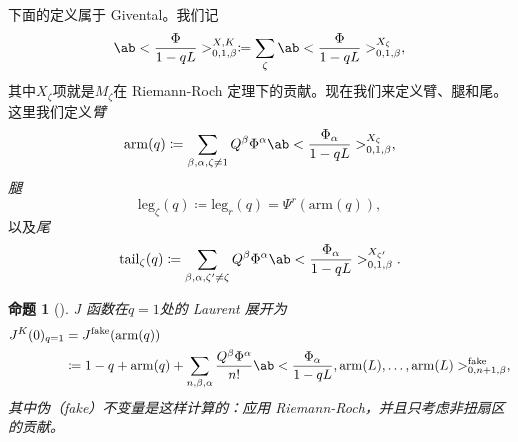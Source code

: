 \documentclass{amsart}
\newtheorem{prop}[thm]{命题}
\theoremstyle{definition}
\theoremstyle{remark}
\theoremstyle{plain}
\theoremstyle{definition}
\theoremstyle{remark}
\newcommand{\mr}[1]{\mathrm{#1}}
\newcommand{\1}{\mathbf{1}}
\newcommand{\2}{\mathbf{2}}
\newcommand{\3}{\mathbf{3}}
\begin{document}
%
%

下面的定义属于 Givental。我们记
\[ \ab<\frac{\Phi}{1-qL}>_{0,1,\beta}^{X,K} \coloneqq \sum_{\zeta} \ab<\frac{\Phi}{1-qL}>_{0,1,\beta}^{X_{\zeta}}, \]
其中\(X_{\zeta}\)项就是\(M_{\zeta}\)在 Riemann-Roch 定理下的贡献。现在我们来定义臂、腿和尾。这里我们定义\textit{臂}
\[ \mr{arm}(q) \coloneqq \sum_{\beta, \alpha, \zeta \neq 1} Q^{\beta} \Phi^{\alpha}\ab<\frac{\Phi_{\alpha}}{1-qL}>_{0,1,\beta}^{X_{\zeta}}, \]
\textit{腿}
\[ \mr{leg}_{\zeta}(q) \coloneqq \mr{leg}_r(q) = \Psi^r (\mr{arm}(q)), \]
以及\textit{尾}
\[ \mr{tail}_{\zeta}(q) \coloneqq \sum_{\beta, \alpha, \zeta' \neq \zeta} Q^{\beta} \Phi^{\alpha} \ab<\frac{\Phi_{\alpha}}{1-qL}>_{0,1,\beta}^{X_{\zeta'}}. \]

\begin{prop}[{\cite{GiventalTonita2014}}]
    J 函数在\(q = 1\)处的 Laurent 展开为
    \begin{align*}
        J^K(0)_{q=1} &= J^{\mr{fake}}(\mr{arm}(q)) \\
        &\coloneqq 1-q + \mr{arm}(q) + \sum_{n,\beta,\alpha} \frac{Q^{\beta}\Phi^{\alpha}}{n!} \ab<\frac{\Phi_{\alpha}}{1-qL}, \mr{arm}(L), \ldots, \mr{arm}(L)>_{0,n+1,\beta}^{\mr{fake}},
    \end{align*}
    其中伪（fake）不变量是这样计算的：应用 Riemann-Roch，并且只考虑非扭扇区的贡献。
\end{prop}
\end{document}
